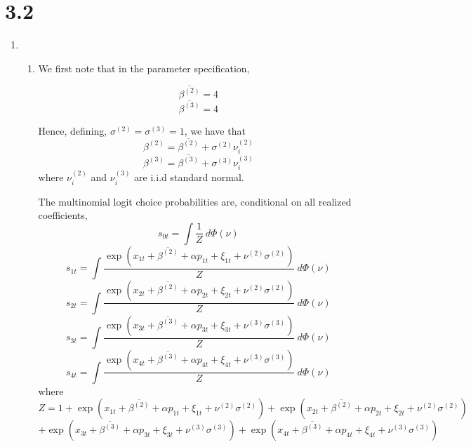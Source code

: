 \documentclass[10pt,letter]{article}
\begin{document}
\section*{3.2}
\begin{enumerate}[label=(\alph*)]
\item \begin{enumerate}[label=(\roman*)]
\item We first note that in the parameter specification,

\[ \overline{\beta^{(2)}} = 4 \]
\[ \overline{\beta^{(3)}} = 4 \]

Hence, defining, $\sigma^{(2)} = \sigma^{(3)} = 1$, we have that
\[ \beta^{(2)} = \overline{\beta^{(2)}} + \sigma^{(2)} \nu_{i}^{(2)}  \]
\[ \beta^{(3)} = \overline{\beta^{(3)}} + \sigma^{(3)} \nu_{i}^{(3)}  \]
where $\nu^{(2)}_i$ and $\nu^{(3)}_i$ are i.i.d standard normal.

The multinomial logit choice probabilities are, conditional on all realized coefficients,
\[ s_{0t} = \int \frac{1}{Z} \ d\Phi(\nu) \]
\[ s_{1t} = \int\frac{\exp(x_{1t} + \overline{\beta^{(2)}} + \alpha p_{1t} + \xi_{1t} + \nu^{(2)}\sigma^{(2)} )}{Z} \ d\Phi(\nu)  \]
\[ s_{2t} = \int\frac{\exp(x_{2t} + \overline{\beta^{(2)}} + \alpha p_{2t} + \xi_{2t} + \nu^{(2)}\sigma^{(2)} )}{Z} \ d\Phi(\nu)  \]
\[ s_{3t} = \int\frac{\exp(x_{3t} + \overline{\beta^{(3)}} + \alpha p_{3t} + \xi_{3t} + \nu^{(3)}\sigma^{(3)} )}{Z} \ d\Phi(\nu)  \]
\[ s_{4t} = \int\frac{\exp(x_{4t} + \overline{\beta^{(3)}} + \alpha p_{4t} + \xi_{4t} + \nu^{(3)}\sigma^{(3)} )}{Z} \ d\Phi(\nu)  \]
where
\[ Z = 1 + \exp(x_{1t} + \overline{\beta^{(2)}} + \alpha p_{1t} + \xi_{1t} + \nu^{(2)}\sigma^{(2)} ) + \exp(x_{2t} + \overline{\beta^{(2)}} + \alpha p_{2t} + \xi_{2t} + \nu^{(2)}\sigma^{(2)} )  \]
\[+ \exp(x_{3t} + \overline{\beta^{(3)}} + \alpha p_{3t} + \xi_{3t} + \nu^{(3)}\sigma^{(3)} ) +\exp(x_{4t} + \overline{\beta^{(3)}} + \alpha p_{4t} + \xi_{4t} + \nu^{(3)}\sigma^{(3)} ) \]
\end{enumerate}
\end{enumerate}
\end{document}
